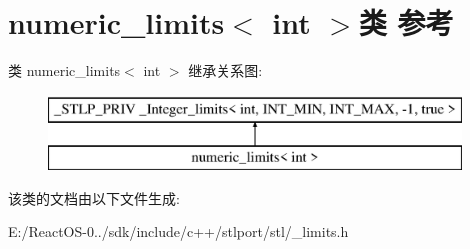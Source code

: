 \hypertarget{classnumeric__limits_3_01int_01_4}{}\section{numeric\+\_\+limits$<$ int $>$类 参考}
\label{classnumeric__limits_3_01int_01_4}
类 numeric\+\_\+limits$<$ int $>$ 继承关系图\+:\begin{figure}[H]
\begin{center}
\leavevmode
\includegraphics[height=2.000000cm]{classnumeric__limits_3_01int_01_4}
\end{center}
\end{figure}


该类的文档由以下文件生成\+:\begin{DoxyCompactItemize}
\item 
E\+:/\+React\+O\+S-\/0../sdk/include/c++/stlport/stl/\+\_\+limits.\+h\end{DoxyCompactItemize}

